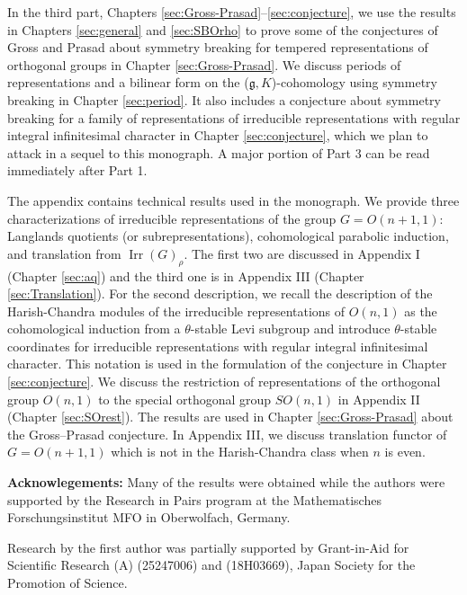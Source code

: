 In the third part,
 Chapters \ref{sec:Gross-Prasad}--\ref{sec:conjecture}, 
 we use the results in Chapters \ref{sec:general} and \ref{sec:SBOrho}
 to prove some of the conjectures of Gross and Prasad about symmetry breaking for tempered representations of orthogonal groups in Chapter \ref{sec:Gross-Prasad}. 
We discuss periods of representations and a bilinear form
 on the ($\mathfrak{g},K$)-cohomology using symmetry breaking
 in Chapter \ref{sec:period}.  
It also includes a conjecture about symmetry breaking for a family of representations of irreducible representations
 with regular integral infinitesimal character
 in Chapter \ref{sec:conjecture},  
 which we plan to attack in a sequel to this monograph. 
A major portion of Part 3 can be read immediately after Part 1. 



The appendix contains technical results used in the monograph. 
We provide three characterizations of irreducible representations
 of the group $G=O(n+1,1)$:
Langlands quotients (or subrepresentations), 
 cohomological parabolic induction, 
 and translation from ${\operatorname{Irr}}(G)_{\rho}$.  
The first two are discussed in Appendix I
 (Chapter \ref{sec:aq})
 and the third one is in Appendix III
 (Chapter \ref{sec:Translation}).  
For the second description,
 we recall the description of the Harish-Chandra modules
 of the irreducible representations of $O(n,1)$
 as the cohomological induction from a $\theta$-stable Levi subgroup
 and introduce $\theta$-stable coordinates for irreducible representations
 with regular integral infinitesimal character. This notation is used in the formulation of the conjecture in Chapter \ref{sec:conjecture}.  
We discuss the restriction of representations of the orthogonal group $O(n,1)$ to the special orthogonal group $SO(n,1)$
 in  Appendix II (Chapter \ref{sec:SOrest}). 
The results are used in Chapter \ref{sec:Gross-Prasad}
 about the Gross--Prasad conjecture.  
In Appendix III, 
 we discuss translation functor of $G=O(n+1,1)$
 which is not in the Harish-Chandra class
 when $n$ is even. 



\bigskip
{\bf{Acknowlegements:}}\enspace
 Many of the results were obtained while the authors were supported by the Research in Pairs program   at the Mathematisches Forschungsinstitut MFO in Oberwolfach, Germany.
 
Research by the first author was partially supported by Grant-in-Aid for Scientific 
Research (A)
(25247006) and (18H03669), Japan Society for the Promotion of Science.  

